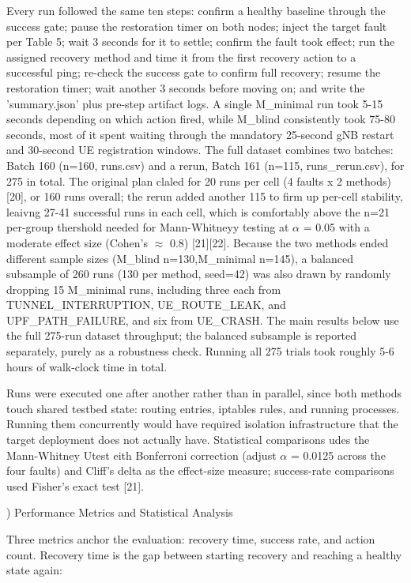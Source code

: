 \documentclass[conference]{IEEEtran}
\begin{document}
Every run followed the same ten steps: confirm a healthy baseline through the success gate; pause the restoration timer on both nodes; inject the target fault per Table 5; wait 3 seconds for it to settle; confirm the fault took effect; run the assigned recovery method and time it from the first recovery action to a successful ping; re-check the success gate to confirm full recovery; resume the restoration timer; wait another 3 seconds before moving on; and write the 'summary.json' plus pre-step artifact logs.
A single M\_minimal run took 5-15 seconds depending on which action fired, while M\_blind consistently took 75-80 seconds, most of it spent waiting through the mandatory 25-second gNB restart and 30-second UE registration windows.
The full dataset combines two batches: Batch 160 (n=160, runs.csv) and a rerun, Batch 161 (n=115, runs\_rerun.csv), for 275 in total. The original plan claled for 20 runs per cell (4 faults x 2 methods) [20], or 160 runs overall; the rerun added another 115 to firm up per-cell stability, leaivng 27-41 successful runs in each cell, which is comfortably above the n=21 per-group thershold needed for Mann-Whitneyy testing at $\alpha$ = 0.05 with a moderate effect size (Cohen's $\approx$ 0.8) [21][22]. Because the two methods ended different sample sizes (M\_blind n=130,M\_minimal n=145), a balanced subsample of 260 runs (130 per method, seed=42) was also drawn by randomly dropping 15 M\_minimal runs, including three each from TUNNEL\_INTERRUPTION, UE\_ROUTE\_LEAK, and UPF\_PATH\_FAILURE, and six from UE\_CRASH. The main results below use the full 275-run dataset throughput; the balanced subsample is reported separately, purely as a robustness check. Running all 275 trials took roughly 5-6 hours of walk-clock time in total.

Runs were executed one after another rather than in parallel, since both methods touch shared testbed state: routing entries, iptables rules, and running processes. Running them concurrently would have required isolation infrastructure that the target deployment does not actually have. Statistical comparisons udes the Mann-Whitney Utest eith Bonferroni correction (adjust $\alpha$ = 0.0125 across the four faults) and Cliff's delta as the effect-size measure; success-rate comparisons used Fisher's exact test [21].

) Performance Metrics and Statistical Analysis

Three metrics anchor the evaluation: recovery time, success rate, and action count. Recovery time is the gap between starting recovery and reaching a healthy state again:
\end{document}
